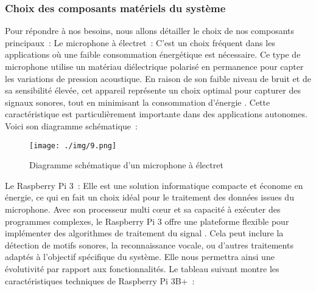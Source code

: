 \subsubsection{Choix des composants matériels du système}
Pour répondre à nos besoins, nous allons détailler le choix de nos composants principaux :
Le microphone à électret : C’est un choix fréquent dans les applications où une faible consommation énergétique est nécessaire. Ce type de microphone utilise un matériau diélectrique polarisé en permanence pour capter les variations de pression acoustique. En raison de son faible niveau de bruit et de sa sensibilité élevée, cet appareil représente un choix optimal pour capturer des signaux sonores, tout en minimisant la consommation d'énergie \cite{66}. Cette caractéristique est particulièrement importante dans des applications autonomes.
Voici son diagramme schématique :
\begin{figure}[H]
	\centering
	\texttt{[image: ./img/9.png]}
	\caption{Diagramme schématique d'un microphone à électret}
\end{figure}
Le Raspberry Pi 3 : Elle est une solution informatique compacte et économe en énergie, ce qui en fait un choix idéal pour le traitement des données issues du microphone. Avec son processeur multi cœur et sa capacité à exécuter des programmes complexes, le Raspberry Pi 3 offre une plateforme flexible pour implémenter des algorithmes de traitement du signal \cite{67}. Cela peut inclure la détection de motifs sonores, la reconnaissance vocale, ou d'autres traitements adaptés à l'objectif spécifique du système. Elle nous permettra ainsi une évolutivité par rapport aux fonctionnalités. Le tableau suivant montre les caractéristiques techniques de Raspberry Pi 3B+ :

